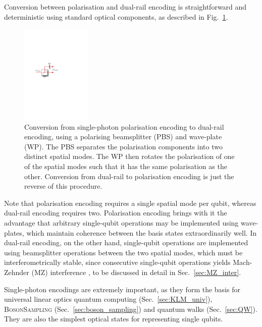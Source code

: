 Conversion between polarisation and dual-rail encoding is straightforward and deterministic using standard optical components, as described in Fig.~\ref{fig:pol_to_dual_conv}.

\begin{figure}[!htbp]
\includegraphics[clip=true, width=0.3\textwidth]{pol_to_dual_conversion}
\captionspacefig \caption{Conversion from single-photon polarisation encoding to dual-rail encoding, using a polarising beamsplitter (PBS) and wave-plate (WP). The PBS separates the polarisation components into two distinct spatial modes. The WP then rotates the polarisation of one of the spatial modes such that it has the same polarisation as the other. Conversion from dual-rail to polarisation encoding is just the reverse of this procedure.} \label{fig:pol_to_dual_conv}
\end{figure}

Note that polarisation encoding requires a single spatial mode per qubit, whereas dual-rail encoding requires two. Polarisation encoding brings with it the advantage that arbitrary single-qubit operations may be implemented using wave-plates, which maintain coherence between the basis states extraordinarily well. In dual-rail encoding, on the other hand, single-qubit operations are implemented using beamsplitter operations between the two spatial modes, which must be interferometrically stable, since consecutive single-qubit operations yields Mach-Zehnder (MZ) interference \cite{bib:Zehnder1, bib:Zehnder2}, to be discussed in detail in Sec.~\ref{sec:MZ_inter}.

Single-photon encodings are extremely important, as they form the basis for universal linear optics quantum computing (Sec.~\ref{sec:KLM_univ}), \textsc{BosonSampling} (Sec.~\ref{sec:boson_sampling}) and quantum walks (Sec.~\ref{sec:QW}). They are also the simplest optical states for representing single qubits.

